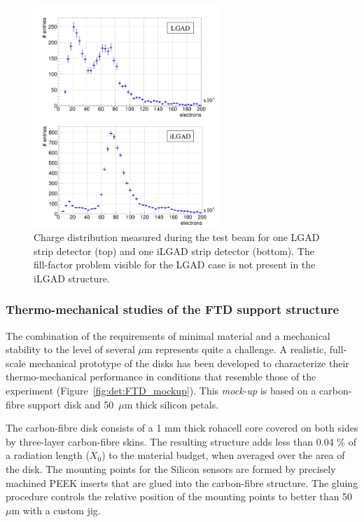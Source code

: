 \begin{figure}[t]
\centering
\includegraphics[width=7cm]{Detector/fig/fill-factor.png}
\caption{Charge distribution measured during the test beam for one LGAD strip detector (top) and one iLGAD strip detector (bottom). The fill-factor problem visible for the LGAD case is not present in the iLGAD structure.} 
\label{fig:det:fill-factor}
\centering
\end{figure}


\subsubsection{Thermo-mechanical studies of the FTD support structure}

The combination of the requirements of minimal material and a mechanical stability to 
the level of several $\mu\mathrm{m}$ represents quite a challenge. A realistic, 
full-scale mechanical prototype of the disks has been developed to characterize 
their thermo-mechanical performance 
in conditions that resemble those of the experiment (Figure~\ref{fig:det:FTD_mockup}). 
This {\em mock-up} is based on a carbon-fibre support disk
and 50~$\mu\mathrm{m}$ thick silicon petals. 

The carbon-fibre disk consists of
a 1 mm thick rohacell core covered on both sides by three-layer carbon-fibre skins. The resulting structure adds less than 0.04 \% of a radiation length ($X_0$) to the material budget, when averaged over the area of the disk. The mounting points for the Silicon sensors are formed by precisely machined 
PEEK inserts that are glued into the carbon-fibre structure. The gluing procedure controls the relative position of the mounting points to better than 50 $\mu \mathrm{m}$ with a custom jig. 

